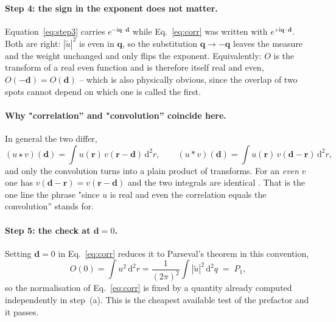 \documentclass[11pt,a4paper]{article}
\newcommand{\dd}{\mathrm d}
\begin{document}
\paragraph{Step 4: the sign in the exponent does not matter.}
Equation~\eqref{eq:step3} carries $e^{-\mathrm i\mathbf q\cdot\mathbf d}$ while
Eq.~\eqref{eq:corr} was written with $e^{+\mathrm i\mathbf q\cdot\mathbf d}$.
Both are right: $|\tilde u|^2$ is even in $\mathbf q$, so the substitution
$\mathbf q\to-\mathbf q$ leaves the measure and the weight unchanged and only
flips the exponent. Equivalently: $O$ is the transform of a real even function
and is therefore itself real and even, $O(-\mathbf d)=O(\mathbf d)$ -- which is
also physically obvious, since the overlap of two spots cannot depend on which
one is called the first.

\paragraph{Why "correlation'' and "convolution'' coincide here.}
In general the two differ,
\begin{equation}
(u\star v)(\mathbf d)=\int\! u(\mathbf r)\,v(\mathbf r-\mathbf d)\,\dd^2r ,
\qquad
(u * v)(\mathbf d)=\int\! u(\mathbf r)\,v(\mathbf d-\mathbf r)\,\dd^2r ,
\end{equation}
and only the convolution turns into a plain product of transforms. For an
\emph{even} $v$ one has $v(\mathbf d-\mathbf r)=v(\mathbf r-\mathbf d)$ and the
two integrals are identical \cite[Ch.~2]{goodman2017}. That is the one line the
phrase "since $u$ is real and even the correlation equals the convolution''
stands for.

\paragraph{Step 5: the check at \boldmath$\mathbf d=0$.}
Setting $\mathbf d=0$ in Eq.~\eqref{eq:corr} reduces it to Parseval's theorem
in this convention,
\begin{equation}
O(0)=\int\! u^2\,\dd^2r
    =\frac{1}{(2\pi)^2}\int\!|\tilde u|^2\,\dd^2q \;=\;P_1 ,
\end{equation}
so the normalisation of Eq.~\eqref{eq:corr} is fixed by a quantity already
computed independently in step~(a). This is the cheapest available test of the
prefactor and it passes.
\end{document}
